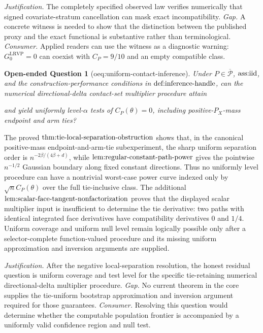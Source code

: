 \documentclass{article}
\newtheorem{openendedquestion}{Open-ended Question}
\begin{document}
\par\smallskip\noindent \textit{Justification.} The completely specified observed law verifies numerically that signed covariate-stratum cancellation can mask exact incompatibility. \textit{Gap.} A concrete witness is needed to show that the distinction between the published proxy and the exact functional is substantive rather than terminological. \textit{Consumer.} Applied readers can use the witness as a diagnostic warning: \(G_0^{\mathrm{LRVP}}=0\) can coexist with \(C_P=9/10\) and an empty compatible class.

\begin{openendedquestion}[oeq:uniform-contact-inference]\label{oeq:uniform-contact-inference}
Under \(P\in\overline{\mathcal P}\), \(\textup{ass:iid}\), and the construction-performance conditions in \(\textup{def:inference-handle}\), can the numerical directional-delta contact-set multiplier procedure attain \par\noindent {}\par\noindent and yield uniformly level-\(\alpha\) tests of \(C_P(\theta)=0\), including positive-\(P_X\)-mass endpoint and arm ties?
\end{openendedquestion}
The proved \(\textup{thm:tie-local-separation-obstruction}\) shows that, in the canonical positive-mass endpoint-and-arm-tie subexperiment, the sharp uniform separation order is \(n^{-2\beta/(4\beta+d)}\), while \(\textup{lem:regular-constant-path-power}\) gives the pointwise \(n^{-1/2}\) Gaussian boundary along fixed constant directions. Thus no uniformly level procedure can have a nontrivial worst-case power curve indexed only by \(\sqrt n C_P(\theta)\) over the full tie-inclusive class. The additional \(\textup{lem:scalar-face-tangent-nonfactorization}\) proves that the displayed scalar multiplier input is insufficient to determine the tie derivative: two paths with identical integrated face derivatives have compatibility derivatives \(0\) and \(1/4\). Uniform coverage and uniform null level remain logically possible only after a selector-complete function-valued procedure and its missing uniform approximation and inversion arguments are supplied.
\par\smallskip\noindent \textit{Justification.} After the negative local-separation resolution, the honest residual question is uniform coverage and test level for the specific tie-retaining numerical directional-delta multiplier procedure. \textit{Gap.} No current theorem in the core supplies the tie-uniform bootstrap approximation and inversion argument required for those guarantees. \textit{Consumer.} Resolving this question would determine whether the computable population frontier is accompanied by a uniformly valid confidence region and null test.
\end{document}
